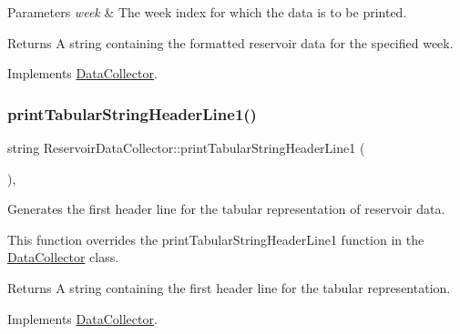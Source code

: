 \begin{DoxyParams}{Parameters}
{\em week} & The week index for which the data is to be printed. \\
\hline
\end{DoxyParams}
\begin{DoxyReturn}{Returns}
A string containing the formatted reservoir data for the specified week. 
\end{DoxyReturn}


Implements \mbox{\hyperlink{classDataCollector_a397fccabe0223267eea8fc7cac0e59da}{Data\+Collector}}.

\mbox{\label{classReservoirDataCollector_a62e7c7abc34c8154b338dfbd284ed665}} 
\subsubsection{\texorpdfstring{print\+Tabular\+String\+Header\+Line1()}{printTabularStringHeaderLine1()}}
{\footnotesize\ttfamily string Reservoir\+Data\+Collector\+::print\+Tabular\+String\+Header\+Line1 (\begin{DoxyParamCaption}{ }\end{DoxyParamCaption})\hspace{0.3cm}{\ttfamily [override]}, {\ttfamily [virtual]}}



Generates the first header line for the tabular representation of reservoir data. 

This function overrides the {\ttfamily print\+Tabular\+String\+Header\+Line1} function in the {\ttfamily \mbox{\hyperlink{classDataCollector}{Data\+Collector}}} class.

\begin{DoxyReturn}{Returns}
A string containing the first header line for the tabular representation. 
\end{DoxyReturn}


Implements \mbox{\hyperlink{classDataCollector_a91619cfa9e9b8cefd2f7c20d5718b41e}{Data\+Collector}}.

\mbox{\label{classReservoirDataCollector_ae2f8e808c5960608e510a64c7f00ad1b}} 
